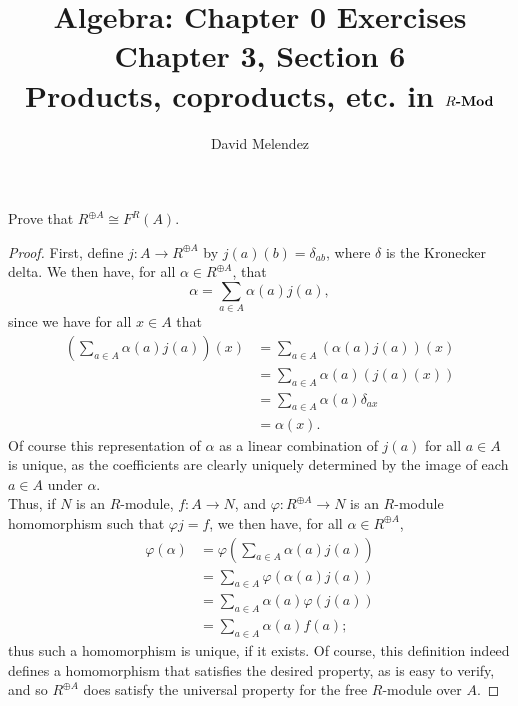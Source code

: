 \documentclass[12pt]{article}
\newenvironment{problem}[2][Problem]{\begin{trivlist}
\item[\hskip \labelsep {\bfseries #1}\hskip \labelsep {\bfseries #2.}]}{\end{trivlist}}
\newcommand{\catname}[1]{\normalfont\textbf{#1}}
\newcommand{\Mod}[1]{#1\catname{-Mod}}
\theoremstyle{remark}
\begin{document}
\title{Algebra: Chapter 0 Exercises\\ \large Chapter 3, Section 6\\ 
\large Products, coproducts, etc. in $\Mod{R}$}
\author{David Melendez}
\maketitle

\begin{problem}{6.1}
  Prove that $R^{\oplus A}\cong F^R(A)$.
\end{problem}
\begin{proof}
  First, define $j:A\to R^{\oplus A}$ by $j(a)(b) = \delta_{ab}$,
  where $\delta$ is the Kronecker delta.
  We then have, for all $\alpha\in R^{\oplus A}$, that
  \begin{equation*}
    \alpha = \sum_{a\in A} \alpha(a)j(a),
  \end{equation*}
  since we have for all $x\in A$ that
  \begin{align*}
    \left( \sum_{a\in A} \alpha(a)j(a) \right)(x)
    &= \sum_{a\in A} (\alpha(a)j(a))(x) \\
    &= \sum_{a\in A} \alpha(a)(j(a)(x)) \\
    &= \sum_{a\in A} \alpha(a)\delta_{ax} \\
    &= \alpha(x).
  \end{align*}
  \indent Of course this representation of $\alpha$ as a linear combination
  of $j(a)$ for all $a\in A$ is unique, as the coefficients are clearly
  uniquely determined by the image of each $a\in A$ under $\alpha$. \\
  \indent Thus, if $N$ is an $R$-module, $f:A\to N$, 
  and $\varphi:R^{\oplus A}\to N$ is an $R$-module homomorphism 
  such that $\varphi j = f$, we then have, for all $\alpha\in R^{\oplus A}$,
  \begin{align*}
    \varphi(\alpha) &= \varphi\left( \sum_{a\in A}\alpha(a)j(a) \right) \\
    &= \sum_{a\in A}\varphi(\alpha(a)j(a)) \\
    &= \sum_{a\in A}\alpha(a)\varphi(j(a)) \\
    &= \sum_{a\in A}\alpha(a)f(a);
  \end{align*}
  thus such a homomorphism is unique, if it exists.
  Of course, this definition indeed defines a homomorphism that satisfies
  the desired property, as is easy to verify, and so $R^{\oplus A}$
  does satisfy the universal property for the free $R$-module over $A$.
\end{proof}
\end{document}
